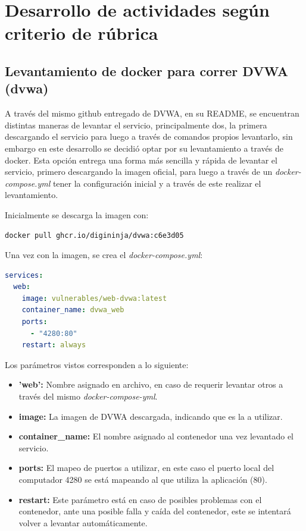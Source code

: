 \documentclass[letter,12pt]{article}
\begin{document}
\section{Desarrollo de actividades según criterio de rúbrica}

\subsection{Levantamiento de docker para correr DVWA (dvwa)}

A través del mismo github entregado de DVWA, en su README, se encuentran distintas maneras de levantar el servicio, principalmente dos, la primera descargando el servicio para luego a través de comandos propios levantarlo, sin embargo en este desarrollo se decidió optar por su levantamiento a través de docker.
Esta opción entrega una forma más sencilla y rápida de levantar el servicio, primero descargando la imagen oficial, para luego a través de un \textit{docker-compose.yml} tener la configuración inicial y a través de este realizar el levantamiento.

Inicialmente se descarga la imagen con:
\begin{lstlisting}[language=bash, caption={Descarga de imagen}]
docker pull ghcr.io/digininja/dvwa:c6e3d05
\end{lstlisting}
Una vez con la imagen, se crea el \textit{docker-compose.yml}:
\begin{lstlisting}[language=YAML, caption={\textit{docker-compose.yml} para DVWA}]
services:
  web:
    image: vulnerables/web-dvwa:latest
    container_name: dvwa_web
    ports:
      - "4280:80"
    restart: always
\end{lstlisting}
Los parámetros vistos corresponden a lo siguiente:
\begin{itemize}
    \item \textbf{'web':} Nombre asignado en archivo, en caso de requerir levantar otros a través del mismo \textit{docker-compose-yml}.
    \item \textbf{image:} La imagen de DVWA descargada, indicando que es la a utilizar.
    \item \textbf{container\_name:} El nombre asignado al contenedor una vez levantado el servicio.
    \item \textbf{ports:} El mapeo de puertos a utilizar, en este caso el puerto local del computador 4280 se está mapeando al que utiliza la aplicación (80).
    \item \textbf{restart:} Este parámetro está en caso de posibles problemas con el contenedor, ante una posible falla y caída del contenedor, este se intentará volver a levantar automáticamente.
\end{itemize}
\end{document}
